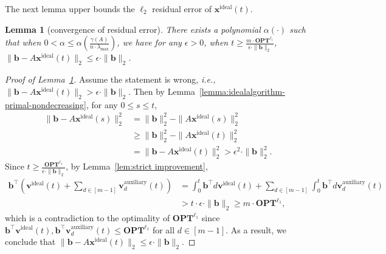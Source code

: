 \documentclass[11pt]{article}
\newtheorem{lemma}{Lemma}[section]
\theoremstyle{remark}
\theoremstyle{definition}
\newcommand{\bx}{\mathbf{x}}
\newcommand{\bb}{\mathbf{b}}
\newcommand{\bv}{\mathbf{v}}
\newcommand{\OPT}{\mathbf{OPT}}
\newcommand{\ie} {{\it i.e.,\ }}
\begin{document}
The next lemma upper bounds the $\ell_2$ residual error of $\bx^\text{ideal}(t)$.
\begin{lemma}[convergence of residual error]\label{lemma:idealalgorithm-l2bound}
	There exists a polynomial $\alpha(\cdot)$ such that when $0<\alpha\leq \alpha(\frac{\gamma(A)}{n\cdot\lambda_{\max}})$, we have  for any $\epsilon>0$, when $t\geq\frac{m\cdot\OPT^{\ell_1}}{\epsilon\cdot\|\bb\|_2}$, $\|\bb-A\bx^{\text{ideal}}(t)\|_2\leq\epsilon\cdot\|\bb\|_2$.
\end{lemma}
\begin{proof}[Proof of Lemma~\ref{lemma:idealalgorithm-l2bound}]
	Assume the statement is wrong, \ie $\|\bb-A\bx^{\text{ideal}}(t)\|_2>\epsilon\cdot\|\bb\|_2$. Then by Lemma~\ref{lemma:idealalgorithm-primal-nondecreasing}, for any $0\leq s\leq t$,
	\begin{align*}
	\|\bb-A\bx^{\text{ideal}}(s)\|_2^2&=\|\bb\|_2^2-\|A\bx^{\text{ideal}}(s)\|_2^2\\
	&\geq\|\bb\|_2^2-\|A\bx^{\text{ideal}}(t)\|_2^2\\
	&=\|\bb-A\bx^{\text{ideal}}(t)\|_2^2>\epsilon^2\cdot\|\bb\|_2^2.
	\end{align*}
	Since $t\geq\frac{\OPT^{\ell_1}}{\epsilon\cdot\|\bb\|_2}$, by Lemma~\ref{lem:strict improvement},
	\begin{align*}
	\bb^\top\left(\bv^\text{ideal}(t)+\sum_{d\in[m-1]}\bv^\text{auxiliary}_d(t)\right) &= \int_0^t\bb^\top d\bv^\text{ideal}(t)+\sum_{d\in[m-1]}\int_0^t\bb^\top d\bv^\text{auxiliary}_d(t)\\
	&> t\cdot\epsilon\cdot\|\bb\|_2\geq m\cdot\OPT^{\ell_1},
	\end{align*}
	which is a contradiction to the optimality of $\OPT^{\ell_1}$ since $\bb^\top\bv^{\text{ideal}}(t),\bb^\top\bv^\text{auxiliary}_d(t)\leq\OPT^{\ell_1}$ for all $d\in[m-1]$. As a result, we conclude that $\|\bb-A\bx^{\text{ideal}}(t)\|_2\leq\epsilon\cdot\|\bb\|_2$.
\end{proof}
\end{document}
